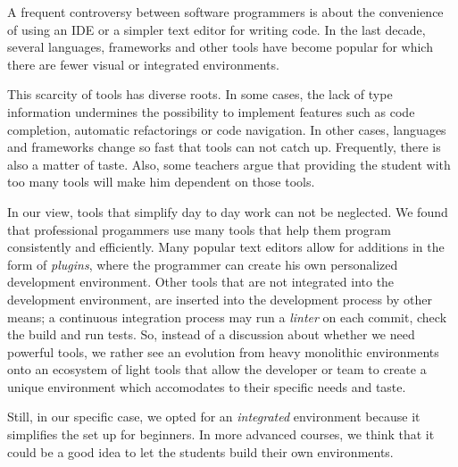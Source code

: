 A frequent controversy between software programmers is about the convenience of using an IDE or a simpler text editor for writing code. In the last decade, several languages, frameworks and other tools have become popular for which there are fewer visual or integrated environments. 

This scarcity of tools has diverse roots. In some cases, the lack of type information undermines the possibility to implement features such as code completion, automatic refactorings or code navigation.
In other cases, languages and frameworks change so fast that tools can not catch up.
Frequently, there is also a matter of taste.
Also, some teachers argue that providing the student with too many tools will make him dependent on those tools.

In our view, tools that simplify day to day work can not be neglected. 
We found that professional progammers use many tools that help them 
program consistently and efficiently.
Many popular text editors allow for additions in the form of \emph{plugins}, 
where the programmer can create his own personalized development environment.
Other tools that are not integrated into the development environment, 
are inserted into the development process by other means; 
\eg a continuous integration process may run a \emph{linter} on each commit, check the build and run tests.
So, instead of a discussion about whether we need powerful tools, we rather see an evolution from heavy monolithic environments
onto an ecosystem of light tools that allow the developer or team to create a unique environment 
which accomodates to their specific needs and taste. 

Still, in our specific case, we opted for an \emph{integrated} environment because it simplifies the set up for beginners. 
In more advanced courses, we think that it could be a good idea to let the students build their own environments.

